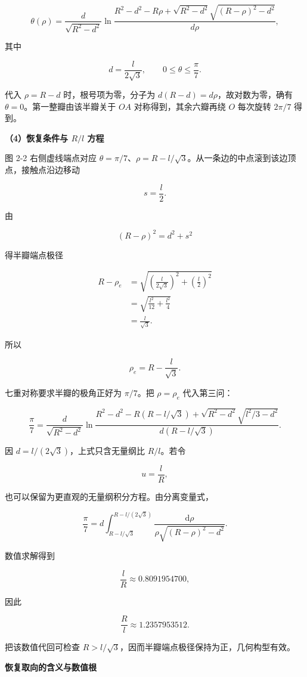 \documentclass[12pt,a4paper,UTF8]{ctexart}
\begin{document}
\[\boxed{
\theta(\rho)=
\frac{d}{\sqrt{R^2-d^2}}
\ln\frac{
R^2-d^2-R\rho+
\sqrt{R^2-d^2}\sqrt{(R-\rho)^2-d^2}
}{d\rho}
},\]

其中

\[d=\frac{l}{2\sqrt3},\qquad 0\le\theta\le\frac{\pi}{7}.\]

代入 \(\rho=R-d\) 时，根号项为零，分子为
\(d(R-d)=d\rho\)，故对数为零，确有 \(\theta=0\)。第一整瓣由该半瓣关于
\(OA\) 对称得到，其余六瓣再绕 \(O\) 每次旋转 \(2\pi/7\) 得到。

\textbf{（4）恢复条件与 \(R/l\) 方程}

图 2-2 右侧虚线端点对应
\(\theta=\pi/7\)、\(\rho=R-l/\sqrt3\)。从一条边的中点滚到该边顶点，接触点沿边移动

\[s=\frac{l}{2}.\]

由

\[(R-\rho)^2=d^2+s^2\]

得半瓣端点极径

\[\begin{aligned}
R-\rho_e
&=\sqrt{\left(\frac{l}{2\sqrt3}\right)^2+\left(\frac l2\right)^2}\\
&=\sqrt{\frac{l^2}{12}+\frac{l^2}{4}}\\
&=\frac{l}{\sqrt3}.
\end{aligned}\]

所以

\[\rho_e=R-\frac{l}{\sqrt3}.\]

七重对称要求半瓣的极角正好为 \(\pi/7\)。把 \(\rho=\rho_e\) 代入第三问：

\[\boxed{
\frac{\pi}{7}=
\frac{d}{\sqrt{R^2-d^2}}
\ln\frac{
R^2-d^2-R\left(R-l/\sqrt3\right)
+\sqrt{R^2-d^2}\sqrt{l^2/3-d^2}
}{d\left(R-l/\sqrt3\right)}
}.\]

因 \(d=l/(2\sqrt3)\)，上式只含无量纲比 \(R/l\)。若令

\[u=\frac{l}{R},\]

也可以保留为更直观的无量纲积分方程。由分离变量式，

\[\boxed{
\frac{\pi}{7}
=d\int_{R-l/\sqrt3}^{R-l/(2\sqrt3)}
\frac{\mathrm{d}\rho}{\rho\sqrt{(R-\rho)^2-d^2}}
}.\]

数值求解得到

\[\frac{l}{R}\approx0.8091954700,\]

因此

\[\boxed{\frac{R}{l}\approx1.2357953512}.\]

把该数值代回可检查
\(R>l/\sqrt3\)，因而半瓣端点极径保持为正，几何构型有效。

\textbf{恢复取向的含义与数值根}
\end{document}
